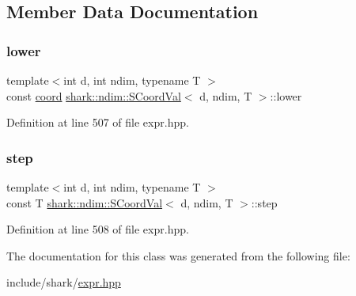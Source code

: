 \subsection{Member Data Documentation}
\hypertarget{classshark_1_1ndim_1_1_s_coord_val_a11ff11a433e0b0cfb8b5de96b3583eb2}{}\label{classshark_1_1ndim_1_1_s_coord_val_a11ff11a433e0b0cfb8b5de96b3583eb2} 
\subsubsection{\texorpdfstring{lower}{lower}}
{\footnotesize\ttfamily template$<$int d, int ndim, typename T $>$ \\
const \hyperlink{namespaceshark_a767a92d5dd82cb82266473bff42fa6d9}{coord} \hyperlink{classshark_1_1ndim_1_1_s_coord_val}{shark\+::ndim\+::\+S\+Coord\+Val}$<$ d, ndim, T $>$\+::lower\hspace{0.3cm}{\ttfamily [private]}}



Definition at line 507 of file expr.\+hpp.

\hypertarget{classshark_1_1ndim_1_1_s_coord_val_afd74ad2086b0e8c5bab9ee5906ec08fa}{}\label{classshark_1_1ndim_1_1_s_coord_val_afd74ad2086b0e8c5bab9ee5906ec08fa} 
\subsubsection{\texorpdfstring{step}{step}}
{\footnotesize\ttfamily template$<$int d, int ndim, typename T $>$ \\
const T \hyperlink{classshark_1_1ndim_1_1_s_coord_val}{shark\+::ndim\+::\+S\+Coord\+Val}$<$ d, ndim, T $>$\+::step\hspace{0.3cm}{\ttfamily [private]}}



Definition at line 508 of file expr.\+hpp.



The documentation for this class was generated from the following file\+:\begin{DoxyCompactItemize}
\item 
include/shark/\hyperlink{expr_8hpp}{expr.\+hpp}\end{DoxyCompactItemize}
